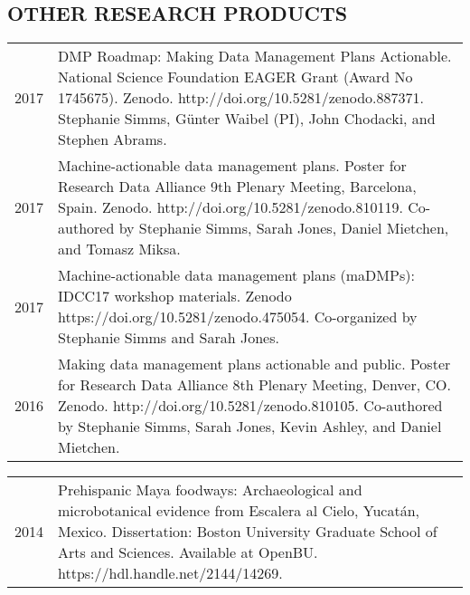 \documentclass[10pt,centered]{res} %
\begin{document}
\begin{resume}
\section{\color{ResumeBlue}OTHER RESEARCH PRODUCTS}
\begin{tabular}{p{.5in}p{5.25in}<{\raggedright\arraybackslash}}
2017 & DMP Roadmap: Making Data Management Plans Actionable. National Science Foundation EAGER Grant (Award No 1745675). Zenodo. http://doi.org/10.5281/zenodo.887371. Stephanie Simms, G\"unter Waibel (PI), John Chodacki, and Stephen Abrams. \\
2017 & Machine-actionable data management plans. Poster for Research Data Alliance 9th Plenary Meeting, Barcelona, Spain. Zenodo. http://doi.org/10.5281/zenodo.810119. Co-authored by Stephanie Simms, Sarah Jones, Daniel Mietchen, and Tomasz Miksa. \\
2017 & Machine-actionable data management plans (maDMPs): IDCC17 workshop materials. Zenodo https://doi.org/10.5281/zenodo.475054. Co-organized by Stephanie Simms and Sarah Jones.\\
2016 & Making data management plans actionable and public. Poster for Research Data Alliance 8th Plenary Meeting, Denver, CO. Zenodo. http://doi.org/10.5281/zenodo.810105. Co-authored by Stephanie Simms, Sarah Jones, Kevin Ashley, and Daniel Mietchen.
\end{tabular}
\begin{tabular}{p{.5in}p{5.25in}<{\raggedright\arraybackslash}}
2014 & Prehispanic Maya foodways: Archaeological and microbotanical evidence from Escalera al Cielo, Yucatán, Mexico. Dissertation: Boston University Graduate School of Arts and Sciences. Available at OpenBU. https://hdl.handle.net/2144/14269.
\end{tabular}


\end{resume}
\end{document}
